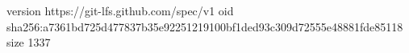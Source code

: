 version https://git-lfs.github.com/spec/v1
oid sha256:a7361bd725d477837b35e92251219100bf1ded93c309d72555e48881fde85118
size 1337
